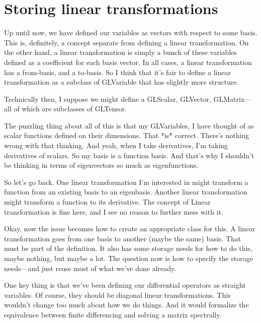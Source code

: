 \documentclass[11pt]{article}
\begin{document}
%
%

\section{Storing linear transformations}

Up until now, we have defined our variables as vectors with respect to some basis. This is, definitely, a concept separate from defining a linear transformation. On the other hand, a linear transformation is simply a bunch of these variables defined as a coefficient for each basis vector. In all cases, a linear transformation has a from-basis, and a to-basis. So I think that it's fair to define a linear transformation as a subclass of GLVariable that has slightly more structure.

Technically then, I suppose we might define a GLScalar, GLVector, GLMatrix---all of which are subclasses of GLTensor.

The puzzling thing about all of this is that my GLVariables, I have thought of as scalar functions defined on their dimensions. That *is* correct. There's nothing wrong with that thinking. And yeah, when I take derivatives, I'm taking derivatives of scalars. So my basis is a function basis. And that's why I shouldn't be thinking in terms of eigenvectors so much as eigenfunctions.

So let's go back. One linear transformation I'm interested in might transform a function from an existing basis to an eigenbasis. Another linear transformation might transform a function to its derivative. The concept of Linear transformation is fine here, and I see no reason to further mess with it.

Okay, now the issue becomes how to create an appropriate class for this. A linear transformation goes from one basis to another (maybe the same) basis. That must be part of the definition. It also has some storage needs for how to do this, maybe nothing, but maybe a lot. The question now is how to specify the storage needs---and just reuse most of what we've done already.

One key thing is that we've been defining our differential operators as straight variables. Of course, they should be diagonal linear transformations. This wouldn't change too much about how we do things. And it would formalize the equivalence between finite differencing and solving a matrix spectrally.
\end{document}

